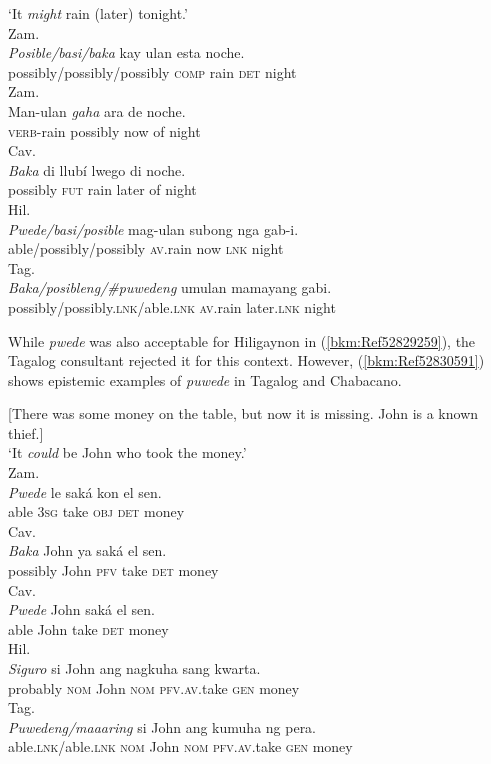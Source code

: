 \documentclass[output=paper,colorlinks,citecolor=brown]{langscibook}
\begin{document}
\ea
{\label{bkm:Ref52829259}‘It \textit{might} rain (later) tonight.’}\\
\ea
{Zam.}\\
\gll \textit{Posible/basi/baka} kay ulan esta noche.\\
     possibly/possibly/possibly \textsc{comp} rain \textsc{det} night\\
\ex
{Zam.}\\
\gll Man-ulan \textit{gaha} ara de noche.\\
     \textsc{verb}{}-rain possibly now of night\\
\ex
{Cav.}\\
\gll \textit{Baka} di llubí lwego di noche.\\
     possibly \textsc{fut} rain later of night\\
\ex
{Hil.}\\
\gll \textit{Pwede/basi/posible} mag-ulan subong nga gab-i.\\
     able/possibly/possibly   \textsc{av}.rain now \textsc{lnk} night\\
\ex
{Tag.}\\
\gll \textit{Baka/posibleng/\#puwedeng} umulan mamayang gabi.\\
possibly/possibly.\textsc{lnk}/able.\textsc{lnk} \textsc{av}.rain later.\textsc{lnk} night\\
\z
\z

While \textit{pwede} was also acceptable for Hiligaynon in (\ref{bkm:Ref52829259}), the Tagalog consultant rejected it for this context. However, (\ref{bkm:Ref52830591}) shows epistemic examples of \textit{puwede} in Tagalog and Chabacano.


\ea
{\label{bkm:Ref52830591}[There was some money on the table, but now it is missing. John is a known thief.]} \\
{‘It \textit{could} be John who took the money.’}\\
\ea
{Zam.}\\
\gll \textit{Pwede} le saká kon el sen.\\
     able 3\textsc{sg} take \textsc{obj} \textsc{det} money  \\
\ex
{Cav.}\\
\gll \textit{Baka} John ya saká el sen.\\
     possibly  John \textsc{pfv} take \textsc{det} money\\
\ex
{Cav.}\\
\gll \textit{Pwede} John saká el sen.\\
     able John take \textsc{det} money\\
\ex
{Hil.}\\
\gll \textit{Siguro} si John ang nagkuha sang kwarta.\\
     probably \textsc{nom} John \textsc{nom} \textsc{pfv.av}.take \textsc{gen} money\\
\ex
{Tag.}\\
\gll \textit{Puwedeng/maaaring} si John ang kumuha ng pera.\\
able.\textsc{lnk}/able.\textsc{lnk} \textsc{nom} John \textsc{nom} \textsc{pfv.av}.take \textsc{gen} money\\
\z
\z
\end{document}
